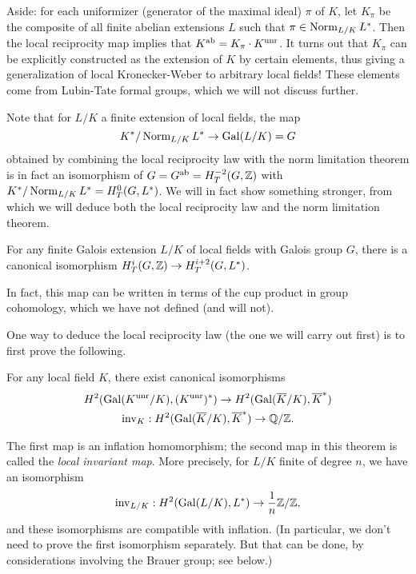 Aside: for each uniformizer (generator of the maximal ideal) $\pi$
of $K$, let $K_\pi$ be the composite of all finite abelian extensions
$L$ such that $\pi \in \operatorname{Norm}_{L/K} L^*$. Then the local reciprocity map
implies that $K^{\operatorname{ab}} = K_\pi \cdot K^{\operatorname{unr}}$. It turns out that $K_\pi$
can be explicitly constructed as the extension of $K$ by certain elements,
thus giving a generalization of local Kronecker-Weber to arbitrary local
fields!
These elements come from Lubin-Tate formal groups, which we will not
discuss further.

Note that for $L/K$ a finite extension of local fields,
the map 
\[
K^*/\operatorname{Norm}_{L/K} L^* \to \operatorname{Gal}(L/K) = G
\] 
obtained by combining the local
reciprocity law with the norm limitation theorem
is in fact an isomorphism of $G = G^{\operatorname{ab}} = H^{-2}_T(G, \mathbb{Z})$
with $K^*/\operatorname{Norm}_{L/K} L^* = H^0_T(G, L^*)$. We will in fact show something
stronger, from which we will deduce both the local reciprocity law and the norm limitation theorem.

\begin{theorem} \label{T:cup product isomorphism}
For any finite Galois extension $L/K$ of local fields
with Galois group $G$, there is a canonical isomorphism
$H^i_T(G, \mathbb{Z}) \to H^{i+2}_T(G, L^*)$.
\end{theorem}
In fact, this map can be written in terms of the cup product in group
cohomology, which we have not defined (and will not).


One way to deduce the local reciprocity law (the one we will carry out first)
is to first prove the following.
\begin{theorem} \label{T:Brauer group identification}
For any local field $K$, there exist canonical isomorphisms
\begin{gather*}
H^2(\operatorname{Gal}(K^{\operatorname{unr}}/K), (K^{\operatorname{unr}})^*) \to
H^2(\operatorname{Gal}(\overline{K}/K), \overline{K}^*)\\
\operatorname{inv}_K: H^2(\operatorname{Gal}(\overline{K}/K), \overline{K}^*) \to \mathbb{Q}/\mathbb{Z}.
\end{gather*}
\end{theorem}
The first map is an inflation homomorphism; the second
map in this theorem is called the \emph{local invariant map}.
More precisely, for $L/K$ finite of degree $n$, we have
an isomorphism
\[
\operatorname{inv}_{L/K}: H^2(\operatorname{Gal}(L/K), L^*) \to \frac{1}{n}\mathbb{Z}/\mathbb{Z},
\]
and these isomorphisms are compatible with inflation. (In particular, we
don't need to prove the first isomorphism separately. But that can be done,
by considerations involving the Brauer group; see below.)


